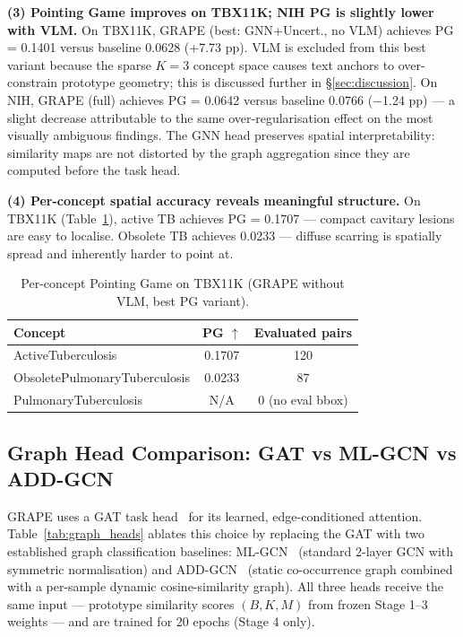 \documentclass{article}
\begin{document}
\textbf{(3) Pointing Game improves on TBX11K; NIH PG is slightly lower with VLM.} On TBX11K, GRAPE (best: GNN+Uncert., no VLM) achieves PG = 0.1401 versus baseline 0.0628 (+7.73 pp). VLM is excluded from this best variant because the sparse $K=3$ concept space causes text anchors to over-constrain prototype geometry; this is discussed further in §\ref{sec:discussion}. On NIH, GRAPE (full) achieves PG = 0.0642 versus baseline 0.0766 ($-$1.24 pp) — a slight decrease attributable to the same over-regularisation effect on the most visually ambiguous findings. The GNN head preserves spatial interpretability: similarity maps are not distorted by the graph aggregation since they are computed before the task head.

\textbf{(4) Per-concept spatial accuracy reveals meaningful structure.} On TBX11K (Table~\ref{tab:pg_perconcept}), active TB achieves PG = 0.1707 — compact cavitary lesions are easy to localise. Obsolete TB achieves 0.0233 — diffuse scarring is spatially spread and inherently harder to point at.

\begin{table}[t]
  \caption{Per-concept Pointing Game on TBX11K (GRAPE without VLM, best PG variant).}
  \label{tab:pg_perconcept}
  \centering
  \begin{tabular}{lcc}
    \toprule
    Concept & PG $\uparrow$ & Evaluated pairs \\
    \midrule
    ActiveTuberculosis          & 0.1707 & 120 \\
    ObsoletePulmonaryTuberculosis & 0.0233 & 87 \\
    PulmonaryTuberculosis       & N/A    & 0 (no eval bbox) \\
    \bottomrule
  \end{tabular}
\end{table}

\subsection{Graph Head Comparison: GAT vs ML-GCN vs ADD-GCN}
\label{sec:graph_heads}

GRAPE uses a GAT task head~\cite{velickovic2018graph} for its learned, edge-conditioned attention.
Table~\ref{tab:graph_heads} ablates this choice by replacing the GAT with two established graph classification baselines: ML-GCN~\cite{chen2019multilabel} (standard 2-layer GCN with symmetric normalisation) and ADD-GCN~\cite{ye2020attention} (static co-occurrence graph combined with a per-sample dynamic cosine-similarity graph).
All three heads receive the same input — prototype similarity scores $(B, K, M)$ from frozen Stage 1–3 weights — and are trained for 20 epochs (Stage 4 only).
\end{document}
